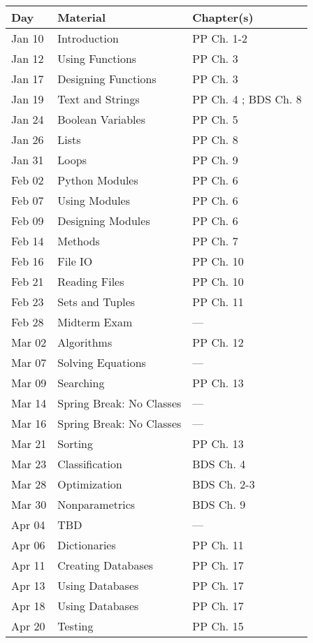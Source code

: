 \documentclass[11pt]{paper}
\begin{document}
\begin{center}
\begin{tabular}{| l | l | l |}\hline
 Day & Material & Chapter(s) \\\hline 
 Jan 10 & Introduction & PP Ch. 1-2 \\
 Jan 12 & Using Functions & PP Ch. 3 \\
 Jan 17 & Designing Functions & PP Ch. 3 \\
 Jan 19 & Text and Strings & PP Ch. 4 ; BDS Ch. 8 \\
 Jan 24 & Boolean Variables & PP Ch. 5\\
 Jan 26 & Lists & PP Ch. 8 \\
 Jan 31 & Loops & PP Ch. 9\\
 Feb 02 & Python Modules & PP Ch. 6 \\
 Feb 07 & Using Modules & PP Ch. 6 \\
 Feb 09 & Designing Modules & PP Ch. 6 \\
 Feb 14 & Methods & PP Ch. 7\\
 Feb 16 & File IO & PP Ch. 10 \\
 Feb 21 & Reading Files & PP Ch. 10 \\
 Feb 23 & Sets and Tuples & PP Ch. 11 \\
 Feb 28 & Midterm Exam & --- \\
 Mar 02 & Algorithms & PP Ch. 12 \\
 Mar 07 & Solving Equations & --- \\
 Mar 09 & Searching & PP Ch. 13 \\
 Mar 14 & Spring Break: No Classes & --- \\
 Mar 16 & Spring Break: No Classes & --- \\
 Mar 21 & Sorting & PP Ch. 13\\
 Mar 23 & Classification & BDS Ch. 4 \\
 Mar 28 & Optimization & BDS Ch. 2-3 \\
 Mar 30 & Nonparametrics & BDS Ch. 9 \\
 Apr 04 & TBD & --- \\
 Apr 06 & Dictionaries & PP Ch. 11 \\
 Apr 11 & Creating Databases & PP Ch. 17 \\
 Apr 13 & Using Databases & PP Ch. 17 \\
 Apr 18 & Using Databases & PP Ch. 17 \\
 Apr 20 & Testing & PP Ch. 15 \\\hline
\end{tabular}
\end{center}
\end{document}
